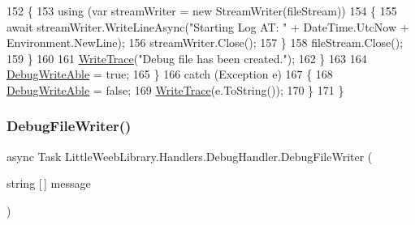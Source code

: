\begin{DoxyCode}
152                     \{
153                         \textcolor{keyword}{using} (var streamWriter = \textcolor{keyword}{new} StreamWriter(fileStream))
154                         \{
155                             await streamWriter.WriteLineAsync(\textcolor{stringliteral}{"Starting Log AT: "} + DateTime.UtcNow + 
      Environment.NewLine);
156                             streamWriter.Close();
157                         \}
158                         fileStream.Close();
159                     \}
160 
161                     \mbox{\hyperlink{class_little_weeb_library_1_1_handlers_1_1_debug_handler_ade74885424ad635ba119c8c146bd7e73}{WriteTrace}}(\textcolor{stringliteral}{"Debug file has been created."});
162                 \}
163 
164                 \mbox{\hyperlink{class_little_weeb_library_1_1_handlers_1_1_debug_handler_a37befa26f60bbf4a6b945fb8be13977e}{DebugWriteAble}} = \textcolor{keyword}{true};
165             \}
166             \textcolor{keywordflow}{catch} (Exception e)
167             \{
168                 \mbox{\hyperlink{class_little_weeb_library_1_1_handlers_1_1_debug_handler_a37befa26f60bbf4a6b945fb8be13977e}{DebugWriteAble}} = \textcolor{keyword}{false};
169                 \mbox{\hyperlink{class_little_weeb_library_1_1_handlers_1_1_debug_handler_ade74885424ad635ba119c8c146bd7e73}{WriteTrace}}(e.ToString());
170             \}
171         \}
\end{DoxyCode}
\mbox{\label{class_little_weeb_library_1_1_handlers_1_1_debug_handler_a37b616e03da950fb30d1087cb7bc69fd}} 
\subsubsection{\texorpdfstring{Debug\+File\+Writer()}{DebugFileWriter()}}
{\footnotesize\ttfamily async Task Little\+Weeb\+Library.\+Handlers.\+Debug\+Handler.\+Debug\+File\+Writer (\begin{DoxyParamCaption}\item[{string \mbox{[}$\,$\mbox{]}}]{message }\end{DoxyParamCaption})\hspace{0.3cm}{\ttfamily [private]}}




